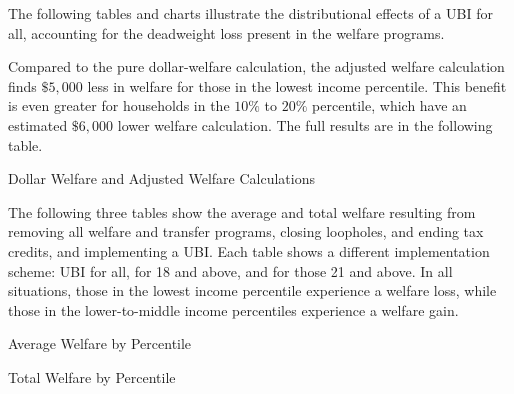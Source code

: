 \documentclass{article}
\begin{document}
The following tables and charts illustrate the distributional effects of a UBI for all, accounting for the deadweight loss present in the welfare programs.

Compared to the pure dollar-welfare calculation, the adjusted welfare calculation finds $\$5,000$ less in welfare for those in the lowest income percentile. This benefit is even greater for households in the $10\%$ to $20\%$ percentile, which have an estimated $\$6,000$ lower welfare calculation. The full results are in the following table. 

\begin{table}[H]
\caption{Dollar Welfare and Adjusted Welfare Calculations}
\begin{center}
\begin{adjustbox}{max width=\textwidth}

\end{adjustbox}
\end{center}
\end{table}

The following three tables show the average and total welfare resulting from removing all welfare and transfer programs, closing loopholes, and ending tax credits, and implementing a UBI. Each table shows a different implementation scheme: UBI for all, for 18 and above, and for those 21 and above. In all situations, those in the lowest income percentile experience a welfare loss, while those in the lower-to-middle income percentiles experience a welfare gain. 


\begin{table}[H]
\caption{Average Welfare by Percentile}
\begin{center}
\begin{adjustbox}{max width=\textwidth}

\end{adjustbox}
\end{center}
\end{table}


\begin{table}[H]
\caption{Total Welfare by Percentile}
\begin{center}
\begin{adjustbox}{max width=\textwidth}

\end{adjustbox}
\end{center}
\end{table}
\end{document}
